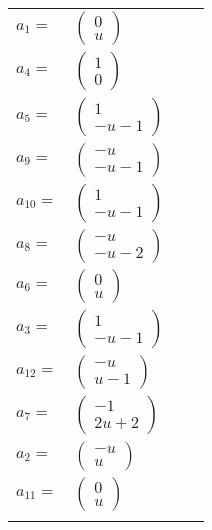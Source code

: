 \documentclass[1p]{elsarticle_modified}
\theoremstyle{definition}
\begin{document}
\begin{tabular}{m{7pt} m{180pt} m{7pt} m{180pt} }
\flushright $a_{1}=$&$\begin{pmatrix}0\\u\end{pmatrix}$ \\
\flushright $a_{4}=$&$\begin{pmatrix}1\\0\end{pmatrix}$ \\
\flushright $a_{5}=$&$\begin{pmatrix}1\\- u-1\end{pmatrix}$ \\
\flushright $a_{9}=$&$\begin{pmatrix}- u\\- u-1\end{pmatrix}$ \\
\flushright $a_{10}=$&$\begin{pmatrix}1\\- u-1\end{pmatrix}$ \\
\flushright $a_{8}=$&$\begin{pmatrix}- u\\- u-2\end{pmatrix}$ \\
\flushright $a_{6}=$&$\begin{pmatrix}0\\u\end{pmatrix}$ \\
\flushright $a_{3}=$&$\begin{pmatrix}1\\- u-1\end{pmatrix}$ \\
\flushright $a_{12}=$&$\begin{pmatrix}- u\\u-1\end{pmatrix}$ \\
\flushright $a_{7}=$&$\begin{pmatrix}-1\\2 u+2\end{pmatrix}$ \\
\flushright $a_{2}=$&$\begin{pmatrix}- u\\u\end{pmatrix}$ \\
\flushright $a_{11}=$&$\begin{pmatrix}0\\u\end{pmatrix}$\\&\end{tabular}
\end{document}
